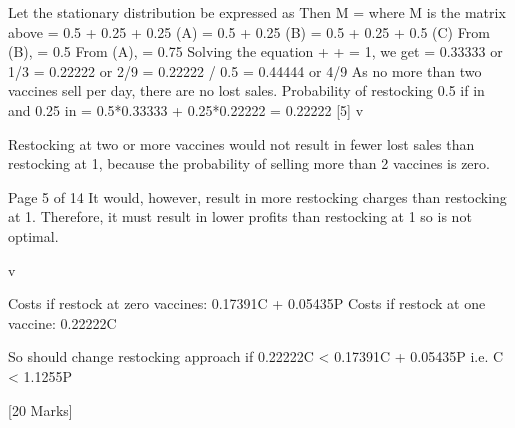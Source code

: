 \documentclass[a4paper,12pt]{article}
\begin{document}
Let the stationary distribution be expressed as \lambda
Then \lambda M = \lambda where M is the matrix above
 = 0.5  + 0.25  + 0.25  (A) 
 = 0.5  + 0.25  (B) 
 = 0.5  + 0.25  + 0.5  (C) 
From (B),  = 0.5 
From (A),  = 0.75 
Solving the equation  +  +  = 1, we get
 = 0.33333 or 1/3 
 = 0.22222 or 2/9 
 = 0.22222 / 0.5 = 0.44444 or 4/9 
As no more than two vaccines sell per day, there are no lost sales.
Probability of restocking 0.5 if in  and 0.25 in  = 0.5*0.33333 + 0.25*0.22222 = 0.22222 
[5]
v\item 
Restocking at two or more vaccines would not result in fewer lost sales than restocking at 1, because the probability of selling more than 2 vaccines is zero.

Page 5 of 14
It would, however, result in more restocking charges than restocking at 1.
Therefore, it must result in lower profits than restocking at 1 so is not optimal. 

v\item  
Costs if restock at zero vaccines: 0.17391C + 0.05435P 
Costs if restock at one vaccine: 0.22222C

So should change restocking approach if 0.22222C < 0.17391C + 0.05435P
i.e. C < 1.1255P


[20 Marks]
\end{document}
